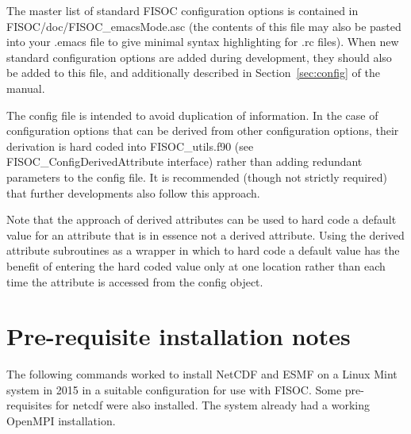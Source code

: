 \documentclass[12pt]{article}
\begin{document}
The master list of standard FISOC configuration options is contained in 
FISOC/doc/FISOC\_emacsMode.asc (the contents of this file may also be 
pasted into your .emacs file to give minimal syntax highlighting for .rc 
files). 
When new standard configuration options are added during development, they 
should also be added to this file, and additionally described in 
Section~\ref{sec:config} of the manual.

The config file is intended to avoid duplication of information.  
In the case of configuration options that can be derived from other 
configuration options, their derivation is hard coded into 
FISOC\_utils.f90 (see FISOC\_ConfigDerivedAttribute interface) 
rather than adding redundant parameters to the config file.
It is recommended (though not strictly required) that further developments 
also follow this approach. 

Note that the approach of derived attributes can be used to hard code a 
default value for an attribute that is in essence not a derived attribute. 
Using the derived attribute subroutines as a wrapper in which to hard 
code a default value has the benefit of entering the hard coded value 
only at one location rather than each time the attribute is accessed 
from the config object.






\clearpage

\appendix

\section{Pre-requisite installation notes}
\label{app:A}
The following commands worked to install NetCDF and ESMF on a Linux Mint system in 2015 
in a suitable configuration for use with FISOC. 
Some pre-requisites for netcdf were also installed.
The system already had a working OpenMPI installation.
\end{document}

